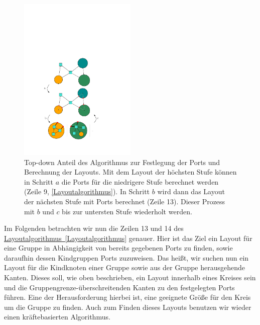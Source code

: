 \begin{figure}[h!]
\begin{center} 
  \includegraphics[width=0.5\textwidth]{Pics/TopDown.pdf}
  \caption{Top-down Anteil des Algorithmus zur Festlegung der Ports und Berechnung der Layouts.
  Mit dem Layout der höchsten Stufe können in Schritt $a$ die Ports für die niedrigere Stufe berechnet werden (Zeile 9, \autoref{Layoutalgorithmus}).
  In Schritt $b$ wird dann das Layout der nächsten Stufe mit Ports berechnet (Zeile 13).
  Dieser Prozess mit $b$ und $c$ bis zur untersten Stufe wiederholt werden. }
  \label{f:TopDown}
\end{center}
\end{figure}


Im Folgenden betrachten wir nun die Zeilen 13 und 14 des \hyperref[Layoutalgorithmus]{Layoutalgorithmus~\ref*{Layoutalgorithmus}} genauer. 
Hier ist das Ziel ein Layout für eine Gruppe in Abhängigkeit von bereits gegebenen Ports zu finden, sowie daraufhin dessen Kindgruppen Ports zuzuweisen.
Das heißt, wir suchen nun ein Layout für die Kindknoten einer Gruppe sowie aus der Gruppe herausgehende Kanten.
Dieses soll, wie oben beschrieben, ein Layout innerhalb eines Kreises sein und die Gruppengrenze-überschreitenden Kanten zu den festgelegten Ports führen.
Eine der Herausforderung hierbei ist, eine geeignete Größe für den Kreis um die Gruppe zu finden. 
Auch zum Finden dieses Layouts benutzen wir wieder einen kräftebasierten Algorithmus.

